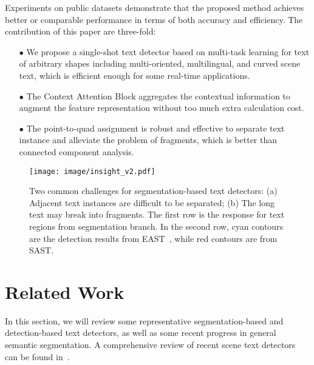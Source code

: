 \documentclass[sigconf]{acmart}
\begin{document}
Experiments on public datasets demonstrate that the proposed method achieves better or comparable performance in terms of both accuracy and efficiency. The contribution of this paper are three-fold:
\begin{itemize}
\item[$\bullet$] We propose a single-shot text detector based on multi-task learning for text of arbitrary shapes including multi-oriented, multilingual, and curved scene text, which is efficient enough for some real-time applications.
\item[$\bullet$] The Context Attention Block aggregates the contextual information to augment the feature representation without too much extra calculation cost.
\item[$\bullet$] The point-to-quad assignment is robust and effective to separate text instance and alleviate the problem of fragments, which is better than connected component analysis.
\end{itemize}





\begin{figure}
\texttt{[image: image/insight\_v2.pdf]}
\caption{Two common challenges for segmentation-based text detectors: (a) Adjacent text instances are difficult to be separated; (b) The long text may break into fragments. The first row is the response for text regions from segmentation branch. In the second row, cyan contours are the detection results from EAST~\cite{zhou2017east}, while red contours are from SAST.} 
  \label{fig:insight}
\end{figure}



\section{Related Work}


In this section, we will review some representative segmentation-based and detection-based text detectors, as well as some recent progress in general semantic segmentation. A comprehensive review of recent scene text detectors can be found in~\cite{ ye2015text, zhu2016scene}.
\end{document}
